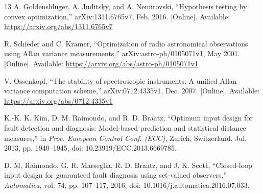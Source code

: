 \begin{thebibliography}{13}
A. Goldenshluger, A. Juditsky, and A. Nemirovski,
``Hypothesis testing by convex optimization,''
arXiv:1311.6765v7, Feb. 2016.
[Online]. Available: \url{https://arxiv.org/abs/1311.6765v7}

R. Schieder and C. Kramer,
``Optimization of radio astronomical observations using Allan variance measurements,''
arXiv:astro-ph/0105071v1, May 2001.
[Online]. Available: \url{https://arxiv.org/abs/astro-ph/0105071v1}

V. Ossenkopf,
``The stability of spectroscopic instruments: A unified Allan variance computation scheme,''
arXiv:0712.4335v1, Dec. 2007.
[Online]. Available: \url{https://arxiv.org/abs/0712.4335v1}

K.-K. K. Kim, D. M. Raimondo, and R. D. Braatz,
``Optimum input design for fault detection and diagnosis: Model-based prediction
and statistical distance measures,'' in \emph{Proc. European Control Conf. (ECC)},
Zurich, Switzerland, Jul. 2013, pp. 1940--1945,
doi: 10.23919/ECC.2013.6669785.

D. M. Raimondo, G. R. Marseglia, R. D. Braatz, and J. K. Scott,
``Closed-loop input design for guaranteed fault diagnosis using set-valued
observers,'' \emph{Automatica}, vol. 74, pp. 107--117, 2016,
doi: 10.1016/j.automatica.2016.07.033.


\end{thebibliography}
